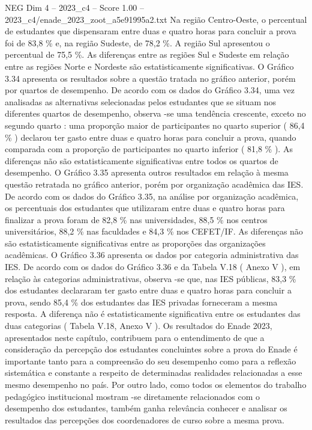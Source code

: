 \begin{textsample}{NEG Dim 4 – 2023\_c4 – Score 1.00 – 2023\_c4/enade\_2023\_zoot\_a5e91995a2.txt}
Na região Centro-Oeste, o percentual de estudantes que dispensaram entre duas e quatro horas para concluir a prova foi de 83,8 \% e, na região Sudeste, de 78,2 \%.
A região Sul apresentou o percentual de 75,5 \%.
As diferenças entre as regiões Sul e Sudeste em relação entre as regiões Norte e Nordeste são estatisticamente significativas.
O Gráfico 3.34 apresenta os resultados sobre a questão tratada no gráfico anterior, porém por quartos de desempenho.
De acordo com os dados do Gráfico 3.34, uma vez analisadas as alternativas selecionadas pelos estudantes que se situam nos diferentes quartos de desempenho, observa -se uma tendência crescente, exceto no segundo quarto : uma proporção maior de participantes no quarto superior ( 86,4 \% ) declarou ter gasto entre duas e quatro horas para concluir a prova, quando comparada com a proporção de participantes no quarto inferior ( 81,8 \% ).
As diferenças não são estatisticamente significativas entre todos os quartos de desempenho.
O Gráfico 3.35 apresenta outros resultados em relação à mesma questão retratada no gráfico anterior, porém por organização acadêmica das IES.
De acordo com os dados do Gráfico 3.35, na análise por organização acadêmica, os percentuais dos estudantes que utilizaram entre duas e quatro horas para finalizar a prova foram de 82,8 \% nas universidades, 88,5 \% nos centros universitários, 88,2 \% nas faculdades e 84,3 \% nos CEFET/IF.
As diferenças não são estatisticamente significativas entre as proporções das organizações acadêmicas.
O Gráfico 3.36 apresenta os dados por categoria administrativa das IES.
De acordo com os dados do Gráfico 3.36 e da Tabela V.18 ( Anexo V ), em relação às categorias administrativas, observa -se que, nas IES públicas, 83,3 \% dos estudantes declararam ter gasto entre duas e quatro horas para concluir a prova, sendo 85,4 \% dos estudantes das IES privadas forneceram a mesma resposta.
A diferença não é estatisticamente significativa entre os estudantes das duas categorias ( Tabela V.18, Anexo V ).
Os resultados do Enade 2023, apresentados neste capítulo, contribuem para o entendimento de que a consideração da percepção dos estudantes concluintes sobre a prova do Enade é importante tanto para a compreensão do seu desempenho como para a reflexão sistemática e constante a respeito de determinadas realidades relacionadas a esse mesmo desempenho no país.
Por outro lado, como todos os elementos do trabalho pedagógico institucional mostram -se diretamente relacionados com o desempenho dos estudantes, também ganha relevância conhecer e analisar os resultados das percepções dos coordenadores de curso sobre a mesma prova.

\end{textsample}
